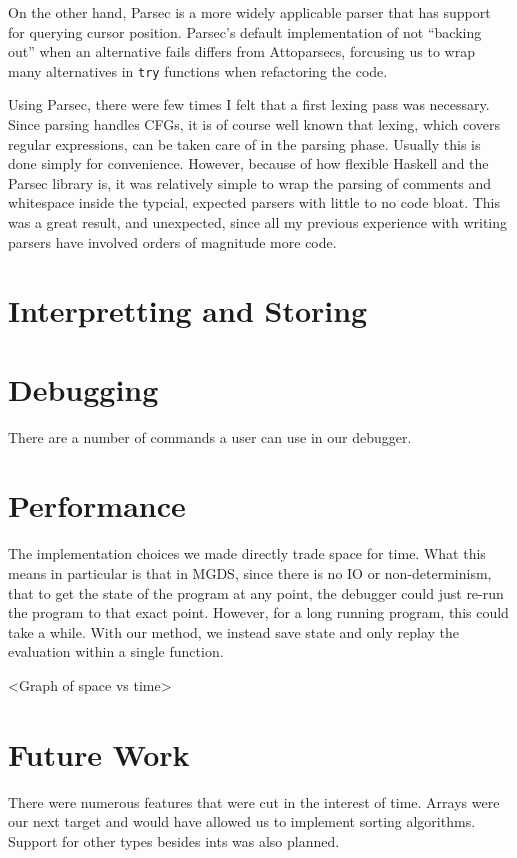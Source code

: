 \documentclass[letterpaper, 10pt]{article}
\newcommand{\ttt}{\texttt}
\begin{document}
On the other hand, Parsec is a more widely applicable parser that has
support for querying cursor position. Parsec's default implementation of
not ``backing out'' when an alternative fails differs from Attoparsecs,
forcusing us to wrap many alternatives in \ttt{try} functions when
refactoring the code.

Using Parsec, there were few times I felt that a first lexing pass was
necessary. Since parsing handles CFGs, it is of course well
known that lexing, which covers regular expressions, can be taken care of
in the parsing phase. Usually this is done simply for
convenience. However, because of how flexible Haskell and the Parsec
library is, it was relatively simple to wrap the parsing of comments and
whitespace inside the typcial, expected parsers with little to no code
bloat. This was a great result, and unexpected, since all my previous
experience with writing parsers have involved orders of magnitude more
code.

\section{Interpretting and Storing}


\section{Debugging}
There are a number of commands a user can use in our debugger.

\section{Performance}
The implementation choices we made directly trade space for time. What
this means in particular is that in MGDS, since there is no IO or
non-determinism, that to get the state of the program at any point, the
debugger could just re-run the program to that exact point. However, for a
long running program, this could take a while. With our method, we instead
save state and only replay the evaluation within a single function.

<Graph of space vs time>

\section{Future Work}
There were numerous features that were cut in the interest of time. Arrays
were our next target and would have allowed us to implement sorting
algorithms. Support for other types besides ints was also planned.
\end{document}
